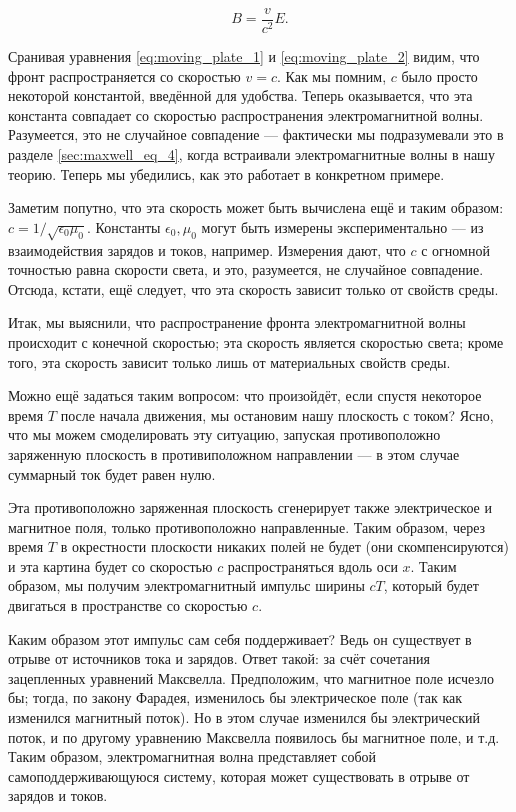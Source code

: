 \documentclass[a4paper,12pt]{article}
\numberwithin{equation}{section}
\newcommand{\eps}{\epsilon}
\begin{document}
\begin{equation}
  \label{eq:moving_plate_2}
  B = \frac{v}{c^2} E.
\end{equation}

Сранивая уравнения \eqref{eq:moving_plate_1} и
\eqref{eq:moving_plate_2} видим, что фронт распространяется со
скоростью $v=c$. Как мы помним, $c$ было просто некоторой константой,
введённой для удобства. Теперь оказывается, что эта константа
совпадает со скоростью распространения электромагнитной
волны. Разумеется, это не случайное совпадение --- фактически мы
подразумевали это в разделе \ref{sec:maxwell_eq_4}, когда встраивали
электромагнитные волны в нашу теорию. Теперь мы убедились, как это
работает в конкретном примере. 

Заметим попутно, что эта скорость может быть вычислена ещё и таким
образом: $c= 1/ \sqrt{\eps_0 \mu_0}$. Константы $\eps_0, \mu_{0}$
могут быть измерены экспериментально --- из взаимодействия зарядов и
токов, например. Измерения дают, что $c$ с огномной точностью равна
скорости света, и это, разумеется, не случайное совпадение. Отсюда,
кстати, ещё следует, что эта скорость зависит только от свойств среды.

Итак, мы выяснили, что распространение фронта электромагнитной волны
происходит с конечной скоростью; эта скорость является скоростью
света; кроме того, эта скорость зависит только лишь от материальных
свойств среды.

Можно ещё задаться таким вопросом: что произойдёт, если спустя
некоторое время $T$ после начала движения, мы остановим нашу плоскость
с током? Ясно, что мы можем смоделировать эту ситуацию, запуская
противоположно заряженную плоскость в противиположном направлении ---
в этом случае суммарный ток будет равен нулю. 

Эта противоположно заряженная плоскость сгенерирует также
электрическое и магнитное поля, только противоположно
направленные. Таким образом, через время $T$ в окрестности плоскости
никаких полей не будет (они скомпенсируются) и эта картина будет со
скоростью $c$ распространяться вдоль оси $x$. Таким образом, мы
получим электромагнитный импульс ширины $cT$, который будет двигаться
в пространстве со скоростью $c$. 

Каким образом этот импульс сам себя поддерживает? Ведь он существует в
отрыве от источников тока и зарядов. Ответ такой: за счёт сочетания
зацепленных уравнений Максвелла. Предположим, что магнитное поле
исчезло бы; тогда, по закону Фарадея, изменилось бы электрическое поле
(так как изменился магнитный поток). Но в этом случае изменился бы
электрический поток, и по другому уравнению Максвелла появилось бы
магнитное поле, и т.д. Таким образом, электромагнитная волна
представляет собой самоподдерживающуюся систему, которая может
существовать в отрыве от зарядов и токов.
\end{document}

